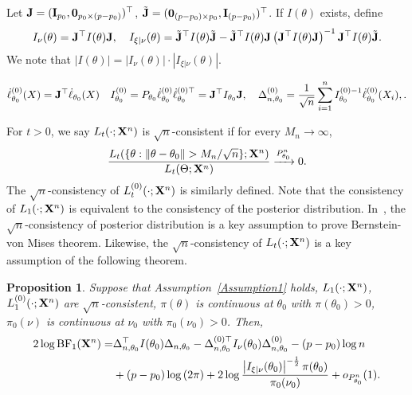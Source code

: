\documentclass[11pt]{article}
\theoremstyle{plain}
\newtheorem{proposition}{\quad\quad Proposition}
\theoremstyle{definition}
\theoremstyle{remark}
\begin{document}
Let
$\mathbf{J}=(\mathbf{I}_{p_0},\mathbf{0}_{p_0\times(p-p_0)})^\top $,
$\tilde{\mathbf{J}}=(\mathbf {0}_{ (p- p_0) \times p_0 },\mathbf{I}_{(p-p_0)})^\top $.
If $I(\theta)$ exists, define
\begin{align*}
    I_{\nu}(\theta)=\mathbf{J}^\top I(\theta) \mathbf{J},
    \quad
    I_{\xi|\nu}(\theta) = 
    \tilde {\mathbf{J}} ^\top  I(\theta) \tilde {\mathbf{J}}
    -
    \tilde {\mathbf{J}} ^\top  I(\theta) \mathbf{J}
    \left(  \mathbf{J} ^\top  I(\theta) \mathbf{J} \right)^{-1}
    \mathbf{J} ^\top  I(\theta) \tilde {\mathbf{J}}
    .
\end{align*}
We note that $|I(\theta)| = |I_{\nu}(\theta)|\cdot |I_{\xi | \nu}(\theta )|$.

$$
\dot{\ell}_{\theta_0}^{(0)}(X)= \mathbf{J}^\top \dot \ell_{\theta_0}(X)
\quad 
I^{(0)}_{\theta_0}=P_{\theta_0}\dot{\ell}_{\theta_0}^{(0)}\dot{\ell}_{\theta_0}^{(0)\top}=\mathbf{J}^\top I_{\theta_0} \mathbf{J},\quad 
\Delta_{n,\theta_0}^{(0)}
=\frac{1}{\sqrt{n}}\sum_{i=1}^n I_{\theta_0}^{(0)-1}\dot{\ell}^{(0)}_{\theta_0}(X_i),
.
$$


For $t>0$, we say $L_t(\cdot;\mathbf{X}^{n})$ is $\sqrt{n}$-consistent if for every $M_n\to \infty$,
    $$
    \frac{L_t({\{\theta:\|\theta-\theta_0\|> M_n/\sqrt{n}\}};\BX^{n})}{L_t(\Theta;\BX^{n})}\xrightarrow{P_{\theta_0}^n} 0.
    $$
    The $\sqrt{n}$-consistency of $L_t^{(0)}(\cdot;\mathbf{X}^{n})$ is similarly defined.
    Note that the consistency of $L_1(\cdot;\mathbf{X}^{n})$ is equivalent to the consistency of the posterior distribution.
    In~\cite{Kleijn2012The}, the $\sqrt{n}$-consistency of posterior distribution is a key assumption to prove Bernstein-von Mises theorem.
    Likewise, the $\sqrt{n}$-consistency of $L_t(\cdot;\mathbf{X}^{n})$ is a key assumption of the following theorem.

    \begin{proposition}
        Suppose that Assumption~\ref{Assumption1} holds, $L_{1}(\cdot;\mathbf{X}^{n})$, $L_{1}^{(0)}(\cdot;\mathbf{X}^{n})$ are $\sqrt{n}$-consistent, $\pi(\theta)$ is continuous at $\theta_0$ with $\pi(\theta_0)>0$, $\pi_0(\nu)$ is continuous at $\nu_0$ with $\pi_0(\nu_0)>0$.
        Then,
\begin{align*}
    2 \log \text{BF}_1 (\mathbf{X}^{n})
    =&
        \Delta_{n,\theta_0}^\top  I(\theta_0)\Delta_{n,\theta_0}
            -
            \Delta_{n,\theta_0}^{{(0)}\top} I_{\nu}(\theta_0)\Delta^{(0)}_{n,\theta_0}
    -(p-p_0) \log n
    \\
    &+
    (p-p_0) \log \left( {2\pi} \right)
   +
   2 \log
       \frac{
           \left|I_{\xi|\nu}(\theta_0)\right|^{-\frac 1 2}\pi(\theta_0) 
   }{
    \pi_0(\nu_0)
}
    +o_{P^n_{\theta_0}}(1)
    .
\end{align*}
\label{prop:expansion}
    \end{proposition}
\end{document}
